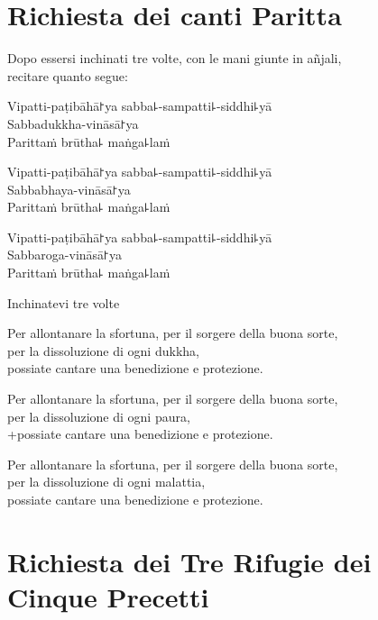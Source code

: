 \clearpage
\chapter{Richiesta dei canti Paritta}

\begin{instruction}
  Dopo essersi inchinati tre volte, con le mani giunte in añjali,\\
  recitare quanto segue:
\end{instruction}

Vipatti-paṭibāhā꜓ya sabba꜕-sampatti꜕-siddhi꜕yā\\
Sabbadukkha-vināsā꜓ya\\
Parittaṁ brūtha꜕ maṅga꜕laṁ

Vipatti-paṭibāhā꜓ya sabba꜕-sampatti꜕-siddhi꜕yā\\
Sabbabhaya-vināsā꜓ya\\
Parittaṁ brūtha꜕ maṅga꜕laṁ

Vipatti-paṭibāhā꜓ya sabba꜕-sampatti꜕-siddhi꜕yā\\
Sabbaroga-vināsā꜓ya\\
Parittaṁ brūtha꜕ maṅga꜕laṁ

\begin{instruction}
  Inchinatevi tre volte
\end{instruction}

\begin{english}
Per allontanare la sfortuna, per il sorgere della buona sorte,\\
per la dissoluzione di ogni dukkha,\\
possiate cantare una benedizione e protezione.

Per allontanare la sfortuna, per il sorgere della buona sorte,\\
per la dissoluzione di ogni paura,\\+possiate cantare una benedizione e protezione.

Per allontanare la sfortuna, per il sorgere della buona sorte,\\
per la dissoluzione di ogni malattia,\\
possiate cantare una benedizione e protezione.
\end{english}

\setlength{\englishIndent}{\leaderIndent}

\clearpage
\chapter[Tre Rifugi e Cinque Precetti]{Richiesta dei Tre Rifugi\newline e dei Cinque Precetti}

